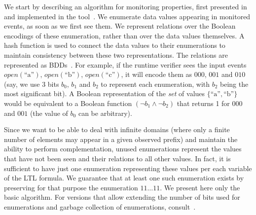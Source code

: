We start by describing an algorithm for monitoring 
\PFLTL{} properties, first presented in~\cite{HPU} and implemented
in the tool~\dejavu. 
We enumerate data values appearing in
monitored events, as soon as we first see them. We
represent relations over the Boolean
encodings of these enumeration, rather than over the data values themselves. A hash function is used to connect the data values to their enumerations to maintain consistency
between these two representations.
The relations are
represented as BDDs~\cite{Bryant}. 
For example, if the runtime verifier sees the input 
events 
$\mathit{open}(\text{``a''})$, 
$\mathit{open}(\text{``b''})$, 
$\mathit{open}(\text{``c''})$, 
it will encode them as
$000$, $001$ and $010$ (say, we use 3 bits $b_0$, $b_1$ and $b_2$
to represent each enumeration, with $b_2$ being the most significant bit).
%
A Boolean representation of the {\em set} of values 
$\{\text{``a''},\text{``b''}\} $ would be equivalent to a Boolean function $(\neg b_1 \wedge \neg b_2)$ that returns 1 for $000$ and $001$ (the value
of $b_0$ can be arbitrary).

%

Since we want to be able to deal with infinite domains
(where only a finite number of elements may appear in a given observed prefix) and maintain the ability to perform
complementation, unused enumerations represent the
values that have not been seen and their relations
to all other values. 
In fact, it is sufficient to have just one enumeration representing these values per each variable of the LTL formula. 
We guarantee that at least one such enumeration exists by preserving for that purpose the enumeration $11\ldots11$.
We present here only the basic algorithm. For versions that
allow extending the number of bits used for enumerations and garbage collection of enumerations, consult~\cite{HP}.


